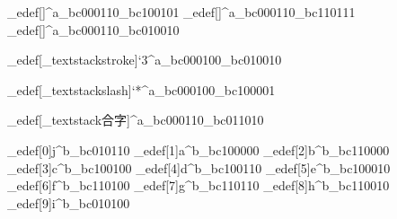 \brl@char_edef[]{\brl@@tilde \brl@@percent ^a}{\brl@char_bc000110\brl@char_bc100101}%
\brl@char_edef[]{\brl@@tilde \brl@@rbrace ^a}{\brl@char_bc000110\brl@char_bc110111}%
\brl@char_edef[]{^a}{\brl@char_bc000110\brl@char_bc010010}%



\brl@char_edef[\brl@char_textstack{stroke}{}]{`3^a}{\brl@char_bc000100\brl@char_bc010010}%

\brl@char_edef[\brl@char_textstack{slash}{}]{`*^a}{\brl@char_bc000100\brl@char_bc100001}%

\brl@char_edef[\brl@char_textstack{合字}{}]{^a}{\brl@char_bc000110\brl@char_bc011010}%


\brl@char_edef[0]{j^b}{\brl@char_bc010110}%
\brl@char_edef[1]{a^b}{\brl@char_bc100000}%
\brl@char_edef[2]{b^b}{\brl@char_bc110000}%
\brl@char_edef[3]{c^b}{\brl@char_bc100100}%
\brl@char_edef[4]{d^b}{\brl@char_bc100110}%
\brl@char_edef[5]{e^b}{\brl@char_bc100010}%
\brl@char_edef[6]{f^b}{\brl@char_bc110100}%
\brl@char_edef[7]{g^b}{\brl@char_bc110110}%
\brl@char_edef[8]{h^b}{\brl@char_bc110010}%
\brl@char_edef[9]{i^b}{\brl@char_bc010100}%




